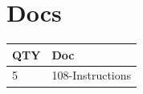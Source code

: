 \documentclass[10pt, A5]{article}
\begin{document}
\begin{framed}
\begin{minipage}{\textwidth}
\begin{multicols}{2}
\begin{center}
			\end{center}

		
		\vfill\null
		\columnbreak

			\section*{\faFile \: Docs}
		 	\begin{center}
			\begin{tabular}{p{2cm}p{4cm}}

			\textbf{QTY} & \textbf{Doc} \\\toprule
										5&108-Instructions\\\midrule
							\end{tabular}
			\end{center}
	

		\vfill\null

		\end{multicols}
\end{minipage}
\end{framed}
\end{document}
